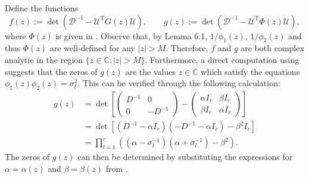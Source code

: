 \documentclass[reqno]{amsart}
\newcommand{\T}{\mathrm{T}}
\theoremstyle{plain}
\theoremstyle{definition}
\begin{document}
Define the functions
\[ f(z) := \det(\mathcal D^{-1} - \mathcal U^\T G(z) \mathcal U), \qquad g(z) := \det \left( \mathcal D^{-1} - \mathcal U^\T \Phi(z) \mathcal U \right), \]
where $\Phi(z)$ is given in \cite[Eq. (25)]{Wang24}.  Observe that, by Lemma 6.1,  $1/\phi_1(z)$, $1/\phi_2(z)$ and thus $\Phi(z)$ are well-defined for any $|z| > M$. Therefore, $f$ and $g$ are both complex analytic in the region $\{z \in \mathbb{C} : |z| > M\}$.  Furthermore, a direct computation using \cite[Eq. (29)]{Wang24} suggests that the zeros of $g(z)$ are the values $z \in \mathbb{C}$ which satisfy the equations $\phi_1(z)\phi_2(z) = \sigma_l^2.$
This can be verified through the following calculation:
\begin{align*}
g(z)&=\det \left[ \begin{pmatrix} D^{-1} & 0\\ 0&-D^{-1} \end{pmatrix}- \begin{pmatrix} \alpha I_r & \beta I_r \\ \beta I_r & \alpha I_r \end{pmatrix} \right] \\
&= \det \left[ (D^{-1} -\alpha I_r)(-D^{-1} - \alpha I_r) -\beta^2 I_r \right]\\
&=\prod_{l=1}^r \left( (\alpha - \sigma_l^{-1})(\alpha + \sigma_l^{-1}) -\beta^2\right).
\end{align*}
The zeros of $g(z)$ can then be determined by substituting the expressions for $\alpha=\alpha(z)$ and $\beta=\beta(z)$ from \cite[Eq. (29)]{Wang24}.
\end{document}
